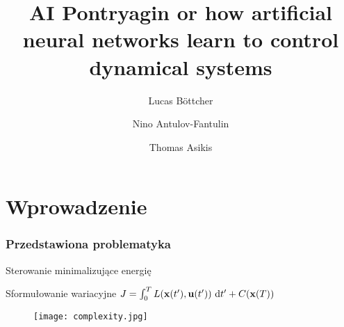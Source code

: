 \documentclass{presentation_fg}
\title[AI Pontryagin]{AI Pontryagin or how artificial neural networks learn to control dynamical systems} %
\author[Filip Gwardecki]{Lucas B\"ottcher \and Nino Antulov-Fantulin \and Thomas Asikis} %
\institute[]{\small Opublikowany 17 stycznia 2022 r. w \smallskip \newline \textit{Nature Communications}} %
\date[28.11.2022 r.]{} %
\begin{document}

\begin{frame}
	\titlepage %
\end{frame}





\section{Wprowadzenie} %


\begin{frame}
	\frametitle{Przedstawiona problematyka} %
	\pause
	{\Large Sterowanie minimalizujące energię}
	\pause
	\begin{block}{Sformułowanie wariacyjne}
		$J=\int\nolimits_{0}^{T}L({{{{{{{\bf{x}}}}}}}}(t^{\prime} ),{{{{{{{\bf{u}}}}}}}}(t^{\prime} ))\ {{{{{\rm{d}}}}}}t^{\prime} +C({{{{{{{\bf{x}}}}}}}}(T))$
	\end{block}
	\pause
	\begin{figure}
		\texttt{[image: complexity.jpg]}
	\end{figure}


\end{frame}
\end{document}

